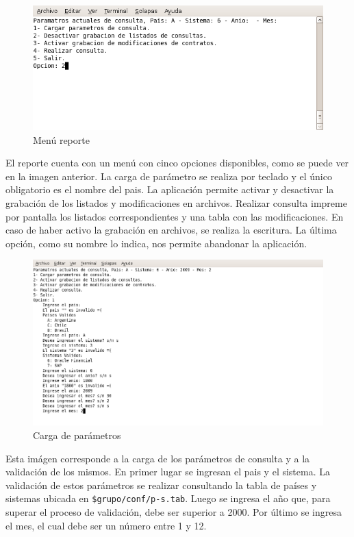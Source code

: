 \documentclass[12pt]{article}
\begin{document}
\begin{description}
	\begin{figure}[H]
	\centering
	\includegraphics[scale=0.5]{imagenes/reporte/reporte_menu.png}
	\caption{Menú reporte}
	\end{figure}

	El reporte cuenta con un menú con cinco opciones disponibles, como se puede ver en la imagen anterior. 
        La carga de parámetro se realiza por teclado y el único obligatorio es el nombre del pais.
        La aplicación permite activar y desactivar la grabación de los listados y modificaciones en archivos.
        Realizar consulta impreme por pantalla los listados correspondientes y una tabla con las modificaciones. 
        En caso de haber activo la grabación en archivos, se realiza la escritura.
        La última opción, como su nombre lo indica, nos permite abandonar la aplicación.

	\begin{figure}[H]
	\centering
	\includegraphics[scale=0.45]{imagenes/reporte/reporte_cargaParametros.png}
	\caption{Carga de parámetros}
	\end{figure}

        Esta imágen corresponde a la carga de los parámetros de consulta y a la validación de los mismos.
        En primer lugar se ingresan el pais y el sistema. 
        La validación de estos parámetros se realizar consultando la tabla de países y sistemas ubicada en \verb|$grupo/conf/p-s.tab|. 
        Luego se ingresa el año que, para superar el proceso de validación, debe ser superior a 2000. 
        Por último se ingresa el mes, el cual debe ser un número entre 1 y 12.  


\end{description}
\end{document}
